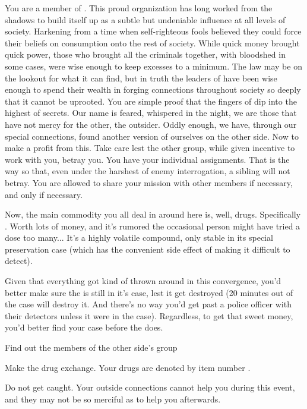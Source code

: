 \documentclass[blue]{guildcamp3}
\begin{document}
\name{\bTechMob{}}


You are a member of \bTechMob{}. This proud organization has long worked from the shadows to build itself up as a subtle but undeniable influence at all levels of \bTechWorld{} society. Harkening from a time when self-righteous fools believed they could force their beliefs on consumption onto the rest of society. While quick money brought quick power, those who brought all the criminals together, with bloodshed in some cases, were wise enough to keep excesses to a minimum. The law may be on the lookout for what it can find, but in truth the leaders of \bTechMob{} have been wise enough to spend their wealth in forging connections throughout society so deeply that it cannot be uprooted. You are simple proof that the fingers of \bTechMob{} dip into the highest of secrets. Our name is feared, whispered in the night, we are those that have not mercy for the other, the outsider. Oddly enough, we have, through our special connections, found another version of ourselves on the other side. Now to make a profit from this. Take care lest the other group, while given incentive to work with you, betray you. You have your individual assignments. That is the way so that, even under the harshest of enemy interrogation, a sibling will not betray. You are allowed to share your mission with other members if necessary, and only if necessary.

Now, the main commodity you all deal in around here is, well, drugs. Specifically \iDrugsTech{}. Worth lots of money, and it's rumored the occasional person might have tried a dose too many... It's a highly volatile compound, only stable in its special preservation case (which has the convenient side effect of making it difficult to detect). 

Given that everything got kind of thrown around in this convergence, you'd better make sure the \iDrugsTech{} is still in it's case, lest it get destroyed (20 minutes out of the case will destroy it. And there's no way you'd get past a police officer with their detectors unless it were in the case). Regardless, to get that sweet money, you'd better find your case before the \bMagicMob{} does. 

\begin{itemz}[Goals]
	\item Find out the members of the other side's group
	\item Make the drug exchange. Your drugs are denoted by item number \iDrugsTech{}.
	\item Do not get caught. Your outside connections cannot help you during this event, and they may not be so merciful as to help you afterwards.
\end{itemz}

\begin{members}
	\member{\cSciOne{\intro}} 
	\member{\cSpecOpTwo{\intro}} 

\end{members}
\end{document}
